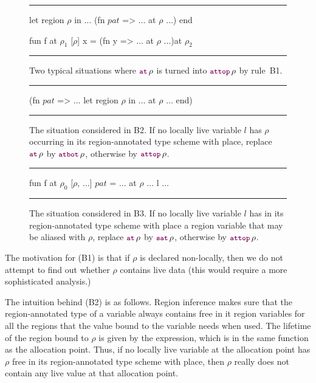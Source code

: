 \documentclass[12pt]{book}
\begin{document}
\begin{figure}[htb]
\hrule
\medskip
\begin{smlcode}
  let region $\rho$
  in $\ldots$ (fn $\mathit{pat}$ => $\ldots$ at $\rho$ $\ldots$)
  end

  fun f at $\rho_1$ [$\rho$] x =
    (fn y => $\ldots$ at $\rho$ $\ldots$)at $\rho_2$
\end{smlcode}
\caption{Two typical situations where $\fw{at}\,\rho$ is turned into
  $\fw{attop}\,\rho$ by
  rule~B1.} \medskip \hrule
\label{b1.fig}
\end{figure}

\begin{figure}[htb]
\hrule
\medskip
\begin{smlcode}
    (fn $\mathit{pat}$ => $\ldots$
        let region $\rho$
        in $\ldots$ at $\rho$ $\ldots$
        end)
\end{smlcode}
\caption{The situation considered in B2. If no locally live variable $l$ has
  $\rho$ occurring in its region-annotated type scheme with place, replace
  $\fw{at}\,\rho$ by $\fw{atbot}\,\rho$, otherwise by
  $\fw{attop}\,\rho$.}  \medskip \hrule
\label{b2.fig}
\end{figure}

\begin{figure}[htb]
\hrule
\medskip
\begin{smlcode}
    fun f at $\rho_0$ [$\rho$, $\ldots$] $\mathit{pat}$ =
      $\ldots$ at $\rho$ $\ldots$ l $\ldots$
\end{smlcode}
\caption{The situation considered in B3. If no locally live variable $l$ has in
  its region-annotated type scheme with place a region variable that may be
  aliased with $\rho$, replace $\fw{at}\,\rho$ by $\fw{sat}\,\rho$, otherwise by
  $\fw{attop}\,\rho$.}  \medskip \hrule
\label{b3.fig}
\end{figure}

The motivation for (B1) is that if $\rho$ is declared non-locally, then we do
not attempt to find out whether $\rho$ contains live data (this would require a
more sophisticated analysis.)

The intuition behind (B2) is as follows. Region inference makes sure that the
region-annotated type of a variable always contains free in it region variables
for all the regions that the value bound to the variable needs when used. The
lifetime of the region bound to $\rho$ is given by the 
expression, which is in the same function as the allocation point. Thus, if no
locally live variable at the allocation point has $\rho$ free in its
region-annotated type scheme with place, then $\rho$ really does not contain any
live value at that allocation point.
\end{document}
